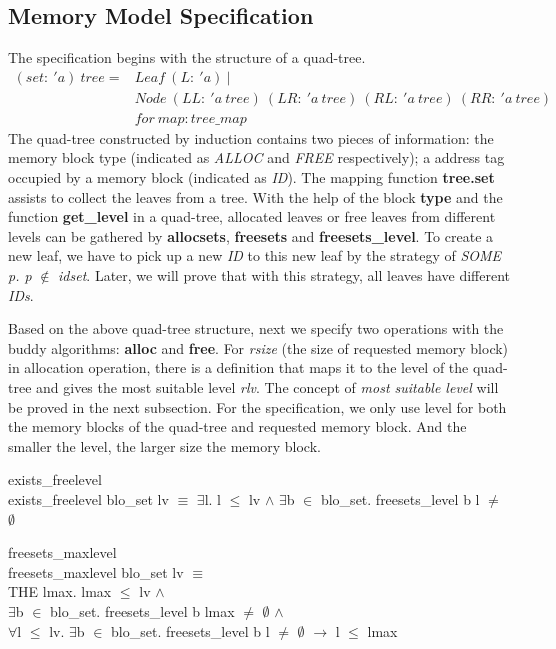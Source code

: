 \documentclass[runningheads]{llncs}
\begin{document}
\subsection{Memory Model Specification}
The specification begins with the structure of a quad-tree.
\begin{align*}
(set:\ 'a)\ tree = &Leaf\ (L:\ 'a)\ | \\
&Node\ (LL:\ 'a\ tree)\ (LR:\ 'a\ tree)\ (RL:\ 'a\ tree)\ (RR:\ 'a\ tree) \\
&for\ map: tree\_map
\end{align*}
The quad-tree constructed by induction contains two pieces of information: the memory block type (indicated as \textsl{ALLOC} and \textsl{FREE} respectively); a address tag occupied by a memory block (indicated as \textsl{ID}). The mapping function \textbf{tree.set} assists to collect the leaves from a tree. With the help of the block \textbf{type} and the function \textbf{get\_level} in a quad-tree, allocated leaves or free leaves from different levels can be gathered by \textbf{allocsets}, \textbf{freesets} and \textbf{freesets\_level}. To create a new leaf, we have to pick up a new \textsl{ID} to this new leaf by the strategy of \textsl{SOME p. p} $\notin$ \textsl{idset}. Later, we will prove that with this strategy, all leaves have different \textsl{IDs}.

Based on the above quad-tree structure, next we specify two operations with the buddy algorithms: \textbf{alloc} and \textbf{free}. For \textsl{rsize} (the size of requested memory block) in allocation operation, there is a definition that maps it to the level of the quad-tree and gives the most suitable level \textsl{rlv}. The concept of \textsl{most suitable level} will be proved in the next subsection. For the specification, we only use level for both the memory blocks of the quad-tree and requested memory block. And the smaller the level, the larger size the memory block.

\begin{definition} {exists\_freelevel} \\
exists\_freelevel blo\_set lv $\equiv$ $\exists$l. l $\leq$ lv $\wedge$ $\exists$b $\in$ blo\_set. freesets\_level b l $\ne$ $\emptyset$
\end{definition}

\begin{definition} {freesets\_maxlevel}\\
freesets\_maxlevel blo\_set lv $\equiv$ \\
\phantom{x} \hspace{10pt} THE lmax. lmax $\leq$ lv $\wedge$ \\
\phantom{x} \hspace{60pt} $\exists$b $\in$ blo\_set. freesets\_level b lmax $\neq$ $\emptyset$ $\wedge$ \\
\phantom{x} \hspace{60pt} $\forall$l $\leq$ lv. $\exists$b $\in$ blo\_set. freesets\_level b l $\ne$ $\emptyset$ $\longrightarrow$ l $\leq$ lmax
\end{definition}
\end{document}

